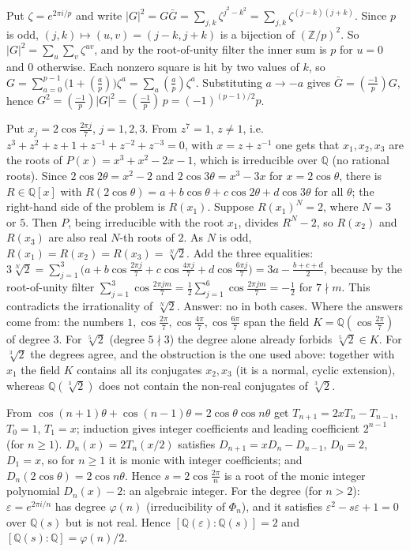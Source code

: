 \documentclass[11pt,a4paper]{article}
\begin{document}

 Put $\zeta=e^{2\pi i/p}$ and write $|G|^2=G\bar G=\sum_{j,k}\zeta^{j^2-k^2}=\sum_{j,k}\zeta^{(j-k)(j+k)}$.
 Since $p$ is odd, $(j,k)\mapsto(u,v)=(j-k,j+k)$ is a bijection of $(\mathbb Z/p)^2$. So $|G|^2=\sum_u\sum_v\zeta^{uv}$, and by the root-of-unity filter the inner sum is $p$ for $u=0$ and $0$ otherwise.
 Each nonzero square is hit by two values of $k$, so $G=\sum_{a=0}^{p-1}\bigl(1+(\tfrac ap)\bigr)\zeta^a=\sum_a(\tfrac ap)\zeta^a$. Substituting $a\to-a$ gives $\bar G=(\tfrac{-1}p)G$, hence $G^2=(\tfrac{-1}p)|G|^2=(\tfrac{-1}p)\,p=(-1)^{(p-1)/2}p$.

 Put $x_j=2\cos\frac{2\pi j}7$, $j=1,2,3$. From $z^7=1$, $z\ne1$, i.e.\ $z^3+z^2+z+1+z^{-1}+z^{-2}+z^{-3}=0$, with $x=z+z^{-1}$ one gets that $x_1,x_2,x_3$ are the roots of $P(x)=x^3+x^2-2x-1$, which is irreducible over $\mathbb Q$ (no rational roots). Since $2\cos2\theta=x^2-2$ and $2\cos3\theta=x^3-3x$ for $x=2\cos\theta$, there is $R\in\mathbb Q[x]$ with $R(2\cos\theta)=a+b\cos\theta+c\cos2\theta+d\cos3\theta$ for all $\theta$; the right-hand side of the problem is $R(x_1)$.
 Suppose $R(x_1)^N=2$, where $N=3$ or $5$. Then $P$, being irreducible with the root $x_1$, divides $R^N-2$, so $R(x_2)$ and $R(x_3)$ are also real $N$-th roots of $2$. As $N$ is odd, $R(x_1)=R(x_2)=R(x_3)=\sqrt[N]2$.
 Add the three equalities: $3\sqrt[N]2=\sum_{j=1}^3\bigl(a+b\cos\frac{2\pi j}7+c\cos\frac{4\pi j}7+d\cos\frac{6\pi j}7\bigr)=3a-\frac{b+c+d}2$, because by the root-of-unity filter $\sum_{j=1}^{3}\cos\frac{2\pi jm}7=\frac12\sum_{j=1}^{6}\cos\frac{2\pi jm}7=-\frac12$ for $7\nmid m$. This contradicts the irrationality of $\sqrt[N]2$. Answer: no in both cases.
 Where the answers come from: the numbers $1,\cos\frac{2\pi}7,\cos\frac{4\pi}7,\cos\frac{6\pi}7$ span the field $K=\mathbb Q(\cos\frac{2\pi}7)$ of degree $3$. For $\sqrt[5]2$ (degree $5\nmid3$) the degree alone already forbids $\sqrt[5]2\in K$. For $\sqrt[3]2$ the degrees agree, and the obstruction is the one used above: together with $x_1$ the field $K$ contains all its conjugates $x_2,x_3$ (it is a normal, cyclic extension), whereas $\mathbb Q(\sqrt[3]2)$ does not contain the non-real conjugates of $\sqrt[3]2$.

 From $\cos(n+1)\theta+\cos(n-1)\theta=2\cos\theta\cos n\theta$ get $T_{n+1}=2xT_n-T_{n-1}$, $T_0=1$, $T_1=x$; induction gives integer coefficients and leading coefficient $2^{n-1}$ (for $n\ge1$).
 $D_n(x)=2T_n(x/2)$ satisfies $D_{n+1}=xD_n-D_{n-1}$, $D_0=2$, $D_1=x$, so for $n\ge1$ it is monic with integer coefficients; and $D_n(2\cos\theta)=2\cos n\theta$. Hence $s=2\cos\frac{2\pi}n$ is a root of the monic integer polynomial $D_n(x)-2$: an algebraic integer.
 For the degree (for $n>2$): $\varepsilon=e^{2\pi i/n}$ has degree $\varphi(n)$ (irreducibility of $\Phi_n$), and it satisfies $\varepsilon^2-s\varepsilon+1=0$ over $\mathbb Q(s)$ but is not real. Hence $[\mathbb Q(\varepsilon):\mathbb Q(s)]=2$ and $[\mathbb Q(s):\mathbb Q]=\varphi(n)/2$.
\end{document}

